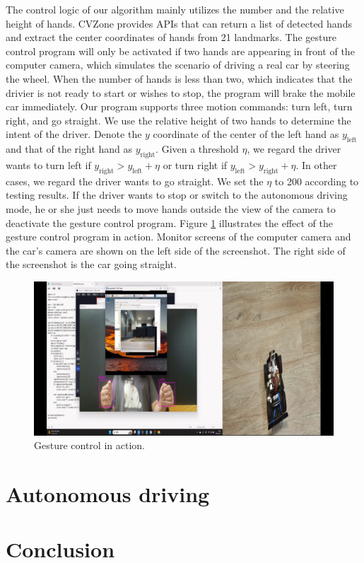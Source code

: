 \documentclass[acmsmall]{acmart}
\begin{document}
The control logic of our algorithm mainly utilizes the number and the relative height of hands. CVZone provides APIs that can return a list of detected hands and extract the center coordinates of hands from 21 landmarks. The gesture control program will only be activated if two hands are appearing in front of the computer camera, which simulates the scenario of driving a real car by steering the wheel. When the number of hands is less than two, which indicates that the drivier is not ready to start or wishes to stop, the program will brake the mobile car immediately. Our program supports three motion commands: turn left, turn right, and go straight. We use the relative height of two hands to determine the intent of the driver. Denote the $y$ coordinate of the center of the left hand as $y_{\text{left}}$ and that of the right hand as $y_{\text{right}}$. Given a threshold $\eta$, we regard the driver wants to turn left if $y_{\text{right}} > y_{\text{left}} + \eta$ or turn right if $y_{\text{left}} > y_{\text{right}} + \eta$. In other cases, we regard the driver wants to go straight. We set the $\eta$ to 200 according to testing results. If the driver wants to stop or switch to the autonomous driving mode, he or she just needs to move hands outside the view of the camera to deactivate the gesture control program. Figure \ref{fig:gesture-control} illustrates the effect of the gesture control program in action. Monitor screens of the computer camera and the car's camera are shown on the left side of the screenshot. The right side of the screenshot is the car going straight.
\begin{figure}[!ht]
    \centering
    \includegraphics[width=13cm]{./gesture-control.png}
    \caption{Gesture control in action.}
    \label{fig:gesture-control}
\end{figure}

\section{Autonomous driving}

\section{Conclusion}





\end{document}
